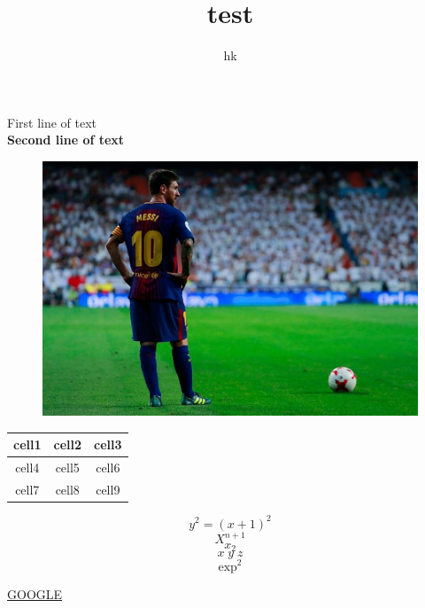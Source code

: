 \documentclass[10pt,a4paper]{article}
\author{hk}
\title{test}
\begin{document}
	\color{red} First line of text\\
	\color{black}
	\textbf{Second line of text}\\
	\begin{figure}
		\centering
		\includegraphics[width=0.9\linewidth]{messi.jpg}
	\end{figure}
	
	\begin{center}
		\begin{tabular}{|c|c|c|}
			\hline
			\textbf{cell1} & \textbf{cell2} & \textbf{cell3}\\
			\hline
			cell4 & cell5 & cell6\\
			\hline
			cell7 & cell8 & cell9\\		
			\hline
		\end{tabular}
	\end{center}
	
	$$ y^2 = (x+1)^2$$
	$$ X^{n+1}$$
	$$ x_2$$
	$$ x\;y\;z $$
	$$ \exp^2 $$
	
	\href{www.google.com}{GOOGLE}
	
	\newpage
	
	
\end{document}

